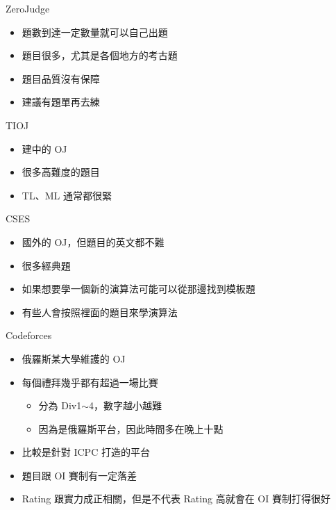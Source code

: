 \documentclass[aspectratio=169]{beamer}
\begin{document}
	\begin{frame}{ZeroJudge}
		\begin{itemize}
			\item 題數到達一定數量就可以自己出題
			\item 題目很多，尤其是各個地方的考古題
			\item 題目品質沒有保障
			\item 建議有題單再去練
		\end{itemize}
	\end{frame}

	\begin{frame}{TIOJ}
		\begin{itemize}
			\item 建中的 OJ
			\item 很多高難度的題目
			\item TL、ML 通常都很緊
		\end{itemize}
	\end{frame}

	\begin{frame}{CSES}
		\begin{itemize}
			\item 國外的 OJ，但題目的英文都不難
			\item 很多經典題
			\item 如果想要學一個新的演算法可能可以從那邊找到模板題
			\item 有些人會按照裡面的題目來學演算法
		\end{itemize}
	\end{frame}

	\begin{frame}{Codeforces}
		\begin{itemize}
			\item 俄羅斯某大學維護的 OJ
			\item 每個禮拜幾乎都有超過一場比賽
				\begin{itemize}
					\item 分為 Div1$\sim$4，數字越小越難
					\item 因為是俄羅斯平台，因此時間多在晚上十點
				\end{itemize}
			\item 比較是針對 ICPC 打造的平台
			\item 題目跟 OI 賽制有一定落差 
			\item Rating 跟實力成正相關，但是不代表 Rating 高就會在 OI 賽制打得很好
		\end{itemize}
	\end{frame}
\end{document}
